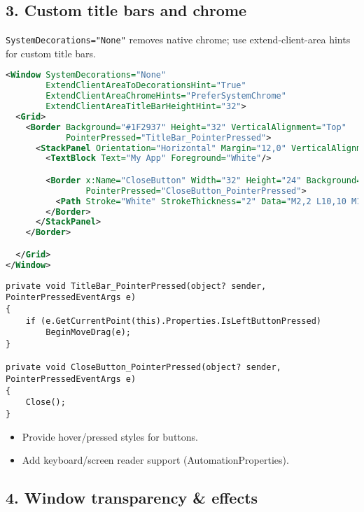\subsection{3. Custom title bars and
chrome}\label{custom-title-bars-and-chrome}

\passthrough{\lstinline!SystemDecorations="None"!} removes native
chrome; use extend-client-area hints for custom title bars.

\begin{lstlisting}[language=XML]
<Window SystemDecorations="None"
        ExtendClientAreaToDecorationsHint="True"
        ExtendClientAreaChromeHints="PreferSystemChrome"
        ExtendClientAreaTitleBarHeightHint="32">
  <Grid>
    <Border Background="#1F2937" Height="32" VerticalAlignment="Top"
            PointerPressed="TitleBar_PointerPressed">
      <StackPanel Orientation="Horizontal" Margin="12,0" VerticalAlignment="Center" Spacing="12">
        <TextBlock Text="My App" Foreground="White"/>

        <Border x:Name="CloseButton" Width="32" Height="24" Background="Transparent"
                PointerPressed="CloseButton_PointerPressed">
          <Path Stroke="White" StrokeThickness="2" Data="M2,2 L10,10 M10,2 L2,10" HorizontalAlignment="Center" VerticalAlignment="Center"/>
        </Border>
      </StackPanel>
    </Border>

  </Grid>
</Window>
\end{lstlisting}

\begin{lstlisting}
private void TitleBar_PointerPressed(object? sender, PointerPressedEventArgs e)
{
    if (e.GetCurrentPoint(this).Properties.IsLeftButtonPressed)
        BeginMoveDrag(e);
}

private void CloseButton_PointerPressed(object? sender, PointerPressedEventArgs e)
{
    Close();
}
\end{lstlisting}

\begin{itemize}
\tightlist
\item
  Provide hover/pressed styles for buttons.
\item
  Add keyboard/screen reader support (AutomationProperties).
\end{itemize}

\subsection{4. Window transparency \&
effects}\label{window-transparency-effects}

